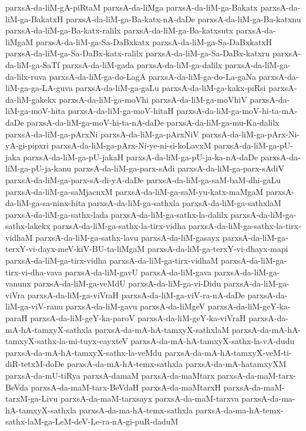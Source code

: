 {parxsA-da-liM-gA-piRtaM
parxsA-da-liMga
parxsA-da-liM-ga-Bakatx
parxsA-da-liM-ga-BakatxH
parxsA-da-liM-ga-Ba-katx-nA-daDe
parxsA-da-liM-ga-Ba-katxnu
parxsA-da-liM-ga-Ba-katx-ralilx
parxsA-da-liM-ga-Ba-katxsutx
parxsA-da-liMgaM
parxsA-da-liM-ga-Sa-DaBxkatx
parxsA-da-liM-ga-Sa-DaBxkatxH
parxsA-da-liM-ga-Sa-DaBx-katx-ralilx
parxsA-da-liM-ga-Sa-DaBx-katxru
parxsA-da-liM-ga-SaTf
parxsA-da-liM-gada
parxsA-da-liM-ga-dalilx
parxsA-da-liM-ga-da-lilx-ruva
parxsA-da-liM-ga-do-LagA
parxsA-da-liM-ga-do-La-gaNa
parxsA-da-liM-ga-ga-LA-guva
parxsA-da-liM-ga-gaLu
parxsA-da-liM-ga-kakx-piRsi
parxsA-da-liM-gakekx
parxsA-da-liM-ga-moVhi
parxsA-da-liM-ga-moVhiV
parxsA-da-liM-ga-moV-hita
parxsA-da-liM-ga-moV-hitaH
parxsA-da-liM-ga-moV-hi-ta-mA-daDe
parxsA-da-liM-ga-moV-hi-ta-nA-daDe
parxsA-da-liM-ga-mu-Ka-dalilx
parxsA-da-liM-ga-pArxNi
parxsA-da-liM-ga-pArxNiV
parxsA-da-liM-ga-pArx-Ni-yA-gi-pipxri
parxsA-da-liM-ga-pArx-Ni-ye-ni-si-koLavxM
parxsA-da-liM-ga-pU-jaka
parxsA-da-liM-ga-pU-jakaH
parxsA-da-liM-ga-pU-ja-ka-nA-daDe
parxsA-da-liM-ga-pU-ja-kanu
parxsA-da-liM-ga-parx-sAdi
parxsA-da-liM-ga-parx-sAdiV
parxsA-da-liM-ga-parx-sA-di-yA-daDe
parxsA-da-liM-ga-saM-baM-dhi-gaLu
parxsA-da-liM-ga-saMjacnxM
parxsA-da-liM-ga-saM-yu-katx-maMgaM
parxsA-da-liM-ga-sa-ninx-hita
parxsA-da-liM-ga-sathxla
parxsA-da-liM-ga-sathxlaM
parxsA-da-liM-ga-sathx-lada
parxsA-da-liM-ga-sathx-la-dalilx
parxsA-da-liM-ga-sathx-lakekx
parxsA-da-liM-ga-sathx-la-tirx-vidha
parxsA-da-liM-ga-sathx-la-tirx-vidhaM
parxsA-da-liM-ga-sathx-lavu
parxsA-da-liM-gasayx
parxsA-da-liM-ga-terxY-vi-dayx-meV-kiV-BU-ta-liMgaM
parxsA-da-liM-ga-terxY-vi-dhayx-mapi
parxsA-da-liM-ga-tirx-vidha
parxsA-da-liM-ga-tirx-vidhaM
parxsA-da-liM-ga-tirx-vi-dha-vava
parxsA-da-liM-gavU
parxsA-da-liM-gava
parxsA-da-liM-ga-vanunx
parxsA-da-liM-ga-veMdU
parxsA-da-liM-ga-vi-Didu
parxsA-da-liM-ga-viVra
parxsA-da-liM-ga-viVraH
parxsA-da-liM-ga-viV-ra-nA-daDe
parxsA-da-liM-ga-viV-ranu
parxsA-da-liM-gavu
parxsA-da-liMgeV
parxsA-da-liM-geY-ka-paraH
parxsA-da-liM-geY-ka-paroV
parxsA-da-liM-geY-ka-viVraH
parxsA-da-mA-hA-tamxyX-sathxla
parxsA-da-mA-hA-tamxyX-sathxlaM
parxsA-da-mA-hA-tamxyX-sathx-la-mi-tuyx-cayxteV
parxsA-da-mA-hA-tamxyX-sathx-la-vA-dudu
parxsA-da-mA-hA-tamxyX-sathx-la-veMdu
parxsA-da-mA-hA-tamxyX-veM-ti-diR-tetxM-doDe
parxsA-da-mA-hA-temx-sathxla
parxsA-da-mA-hatamxyXM
parxsA-da-mU-tiRya
parxsA-damaM
parxsA-da-maMtarx
parxsA-da-maM-tarx-BeVda
parxsA-da-maM-tarx-BeVdaH
parxsA-da-maMtarxH
parxsA-da-maM-tarxM-ga-Livu
parxsA-da-maM-tarxsayx
parxsA-da-maM-tarxva
parxsA-da-ma-hA-tamxyX-sathxla
parxsA-da-ma-hA-temx-sathxla
parxsA-da-ma-hA-temx-sathx-laM-ga-LeM-deV-Le-ra-nA-gi-puR-daduM
}
